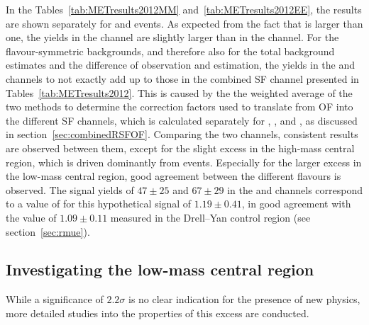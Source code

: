 
In the Tables~\ref{tab:METresults2012MM} and~\ref{tab:METresults2012EE}, the results are shown separately for \EE and \MM events. As expected from the fact that \rmue is larger than one, the yields in the \MM channel are slightly larger than in the \EE channel. For the flavour-symmetric backgrounds, and therefore also for the total background estimates and the difference of observation and estimation, the yields in the \EE and \MM channels to not exactly add up to those in the combined SF channel presented in Tables~\ref{tab:METresults2012}. This is caused by the the weighted average of the two methods to determine the correction factors used to translate from OF into the different SF channels, which is calculated separately for \Rsfof, \Reeof, and \Rmmof, as discussed in section~\ref{sec:combinedRSFOF}. Comparing the two channels, consistent results are observed between them, except for the slight excess in the high-mass central region, which is driven dominantly from \EE events. Especially for the larger excess in the low-mass central region, good agreement between the different flavours is observed. The signal yields of $47\pm25$ and $67\pm29$ in the \EE and \MM channels correspond to a value of \rmue for this hypothetical signal of $1.19\pm0.41$, in good agreement with the value of $1.09\pm0.11$ measured in the Drell--Yan control region (see section~\ref{sec:rmue}).





\subsection*{Investigating the low-mass central region}
While a significance of $2.2\sigma$ is no clear indication for the presence of new physics, more detailed studies into the properties of this excess are conducted. 


